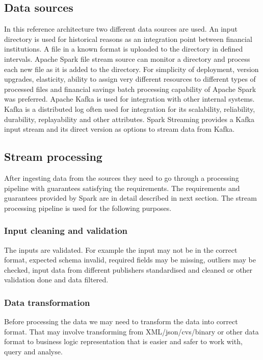 \documentclass[a4paper, 10 pt, conference]{IEEEtran}
\begin{document}
\subsection{Data sources}
In this reference architecture two different data sources are used. An input directory is used for historical reasons as an integration point between financial institutions. A file in a known format is uploaded to the directory in defined intervals. Apache Spark file stream source can monitor a directory and process each new file as it is added to the directory. For simplicity of deployment, version upgrades, elasticity, ability to assign very different resources to different types of processed files and financial savings batch processing capability of Apache Spark was preferred.
Apache Kafka is used for integration with other internal systems. Kafka is a distributed log often used for integration for its scalability, reliability, durability, replayability and other attributes. Spark Streaming provides a Kafka input stream and its direct version as options to stream data from Kafka.

\subsection{Stream processing}
After ingesting data from the sources they need to go through a processing pipeline with guarantees satisfying the requirements. The requirements and guarantees provided by Spark are in detail described in next section.
The stream processing pipeline is used for the following purposes.

\subsubsection{Input cleaning and validation}
The inputs are validated. For example the input may not be in the correct format, expected schema invalid, required fields may be missing, outliers may be checked, input data from different publishers standardised and cleaned or other validation done and data filtered.

\subsubsection{Data transformation}
Before processing the data we may need to transform the data into correct format. That may involve transforming from XML/json/cvs/binary or other data format to business logic representation that is easier and safer to work with, query and analyse.
\end{document}
